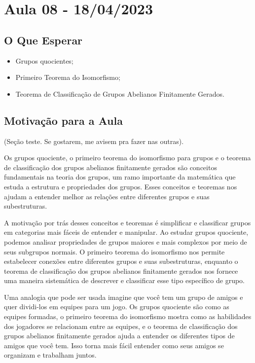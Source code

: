 \documentclass{article}
\begin{document}
\section{Aula 08 - 18/04/2023}
\subsection{O Que Esperar}
\begin{itemize}
  \item Grupos quocientes;
  \item Primeiro Teorema do Isomorfismo;
  \item Teorema de Classifica\c c\~ao de Grupos Abelianos Finitamente Gerados.
\end{itemize}

\subsection{Motiva\c c\~ao para a Aula}
\begin{center}
  (Se\c c\~ao teste. Se gostarem, me avisem pra fazer nas outras).
\end{center}

Os grupos quociente, o primeiro teorema do isomorfismo para grupos e o teorema de classifica\c{c}\~{a}o dos grupos abelianos
finitamente gerados s\~{a}o conceitos fundamentais na teoria dos grupos, um ramo importante da matem\'{a}tica que estuda a 
estrutura e propriedades dos grupos. Esses conceitos e teoremas nos ajudam a entender melhor as rela\c{c}\~{o}es entre 
diferentes grupos e suas subestruturas.

A motiva\c{c}\~{a}o por tr\'{a}s desses conceitos e teoremas \'{e} simplificar e classificar grupos em categorias mais f\'{a}ceis
de entender e manipular. Ao estudar grupos quociente, podemos analisar propriedades de grupos maiores e mais complexos por meio
de seus subgrupos normais. O primeiro teorema do isomorfismo nos permite estabelecer conex\~{o}es entre diferentes grupos e 
suas subestruturas, enquanto o teorema de classifica\c{c}\~{a}o dos grupos abelianos finitamente gerados nos fornece uma 
maneira sistem\'{a}tica de descrever e classificar esse tipo espec\'{i}fico de grupo.

Uma analogia que pode ser usada imagine que voc\^{e} tem um grupo de amigos e quer dividi-los em equipes para um jogo. Os grupos
quociente s\~{a}o como as equipes formadas, o primeiro teorema do isomorfismo mostra como as habilidades dos jogadores se
relacionam entre as equipes, e o teorema de classifica\c{c}\~{a}o dos grupos abelianos finitamente gerados ajuda a entender os
diferentes tipos de amigos que voc\^{e} tem. Isso torna mais f\'{a}cil entender como seus amigos se organizam e trabalham juntos.
\end{document}
